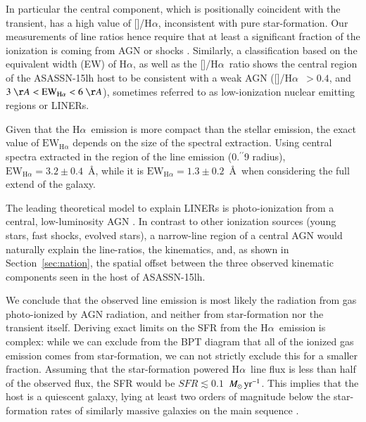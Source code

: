 \documentclass[traditabstract]{aa}
\newcommand{\farc}{\hbox{$.\!\!^{\prime\prime}$}}
\newcommand{\ha}{H$\alpha$}
\newcommand{\nii}{[\ion{N}{ii}]}
\newcommand{\Msunyr}{$M_\odot\,\rm{yr}^{-1}$}
\begin{document}
In particular the central component, which is positionally coincident with the transient, has a high value of \nii/\ha, inconsistent with pure star-formation. Our measurements of line ratios hence require that at least a significant fraction of the ionization is coming from AGN or shocks \citep{2011MNRAS.413.1687C}. Similarly, a classification based on the equivalent width (EW) of \ha, as well as the \nii/\ha~ratio \citep{2011MNRAS.413.1687C} shows the central region of the ASASSN-15lh host to be consistent with a weak AGN (\nii/\ha~$>0.4$, and $3~\AA < \mathrm{EW}_{\mathrm{H}\alpha} < 6~\AA$), sometimes referred to as low-ionization nuclear emitting regions or LINERs. 

Given that the \ha~emission is more compact than the stellar emission, the exact value of $\mathrm{EW}_{\mathrm{H}\alpha}$ depends on the size of the spectral extraction. Using central spectra extracted in the region of the line emission (0\farc{9} radius), $\mathrm{EW}_{\mathrm{H}\alpha}=3.2\pm0.4$~\AA, while it is $\mathrm{EW}_{\mathrm{H}\alpha}=1.3\pm0.2$~\AA~when considering the full extend of the galaxy.

The leading theoretical model to explain LINERs is photo-ionization from a central, low-luminosity AGN \citep[e.g.,][for a review]{2008ARA&A..46..475H}. In contrast to other ionization sources (young stars, fast shocks, evolved stars), a narrow-line region of a central AGN would naturally explain the line-ratios, the kinematics, and, as shown in Section~\ref{sec:nation}, the spatial offset between the three observed kinematic components seen in the host of ASASSN-15lh.

We conclude that the observed line emission is most likely the radiation from gas photo-ionized by AGN radiation, and neither from star-formation nor the transient itself. Deriving exact limits on the SFR from the \ha~emission is complex: while we can exclude from the BPT diagram that all of the ionized gas emission comes from star-formation, we can not strictly exclude this for a smaller fraction. Assuming that the star-formation powered \ha~line flux is less than half of the observed flux, the SFR would be $SFR \lesssim 0.1$~\Msunyr \citep{1998ARA&A..36..189K}. This implies that the host is a quiescent galaxy, lying at least two orders of magnitude below the star-formation rates of similarly massive galaxies on the main sequence \citep[e.g.,][]{2010ApJ...721..193P, 2012ApJ...754L..29W}.
\end{document}
